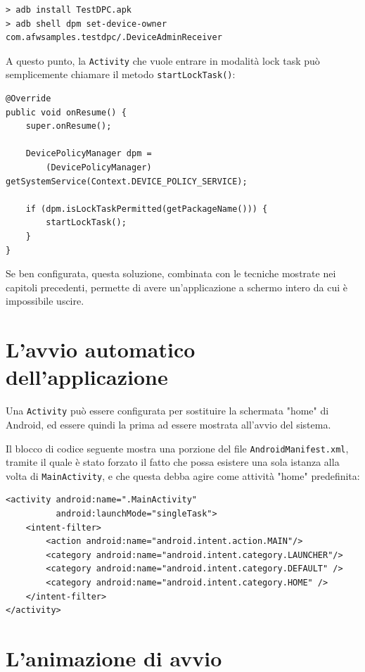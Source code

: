 \begin{verbatim}
> adb install TestDPC.apk
> adb shell dpm set-device-owner com.afwsamples.testdpc/.DeviceAdminReceiver
\end{verbatim}

A questo punto, la \texttt{Activity} che vuole entrare in modalità lock task può semplicemente chiamare il metodo \texttt{startLockTask()}:

\begin{verbatim}
@Override
public void onResume() {
    super.onResume();
    
    DevicePolicyManager dpm =
        (DevicePolicyManager) getSystemService(Context.DEVICE_POLICY_SERVICE);

    if (dpm.isLockTaskPermitted(getPackageName())) {
        startLockTask();
    }
}
\end{verbatim}

Se ben configurata, questa soluzione, combinata con le tecniche mostrate nei capitoli precedenti, permette di avere un'applicazione a schermo intero da cui è impossibile uscire.

\section{L'avvio automatico dell'applicazione}
\label{sec:kiosk_launcher}

Una \texttt{Activity} può essere configurata per sostituire la schermata "home" di Android, ed essere quindi la prima ad essere mostrata all'avvio del sistema.

Il blocco di codice seguente mostra una porzione del file \texttt{AndroidManifest.xml}, tramite il quale è stato forzato il fatto che possa esistere una sola istanza alla volta di \texttt{MainActivity}, e che questa debba agire come attività "home" predefinita:

\begin{verbatim}
<activity android:name=".MainActivity"
          android:launchMode="singleTask">
    <intent-filter>
        <action android:name="android.intent.action.MAIN"/>
        <category android:name="android.intent.category.LAUNCHER"/>
        <category android:name="android.intent.category.DEFAULT" />
        <category android:name="android.intent.category.HOME" />
    </intent-filter>
</activity>
\end{verbatim}

\section{L'animazione di avvio}
\label{sec:kiosk_bootanimation}

